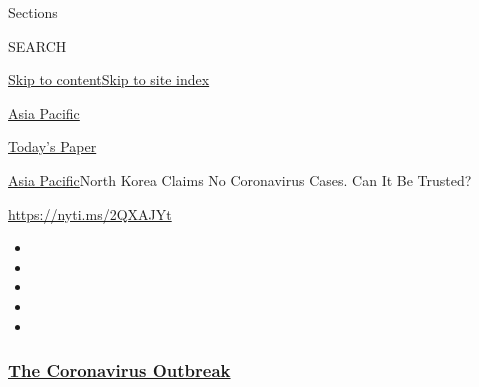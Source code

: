 Sections

SEARCH

\protect\hyperlink{site-content}{Skip to
content}\protect\hyperlink{site-index}{Skip to site index}

\href{https://www.nytimes3xbfgragh.onion/section/world/asia}{Asia
Pacific}

\href{https://myaccount.nytimes3xbfgragh.onion/auth/login?response_type=cookie\&client_id=vi}{}

\href{https://www.nytimes3xbfgragh.onion/section/todayspaper}{Today's
Paper}

\href{/section/world/asia}{Asia Pacific}\textbar{}North Korea Claims No
Coronavirus Cases. Can It Be Trusted?

\url{https://nyti.ms/2QXAJYt}

\begin{itemize}
\item
\item
\item
\item
\item
\end{itemize}

\hypertarget{the-coronavirus-outbreak}{%
\subsubsection{\texorpdfstring{\href{https://www.nytimes3xbfgragh.onion/news-event/coronavirus?name=styln-coronavirus-national\&region=TOP_BANNER\&variant=undefined\&block=storyline_menu_recirc\&action=click\&pgtype=Article\&impression_id=dc64b7e0-e392-11ea-b9d4-1fe3e0583a82}{The
Coronavirus
Outbreak}}{The Coronavirus Outbreak}}\label{the-coronavirus-outbreak}}

